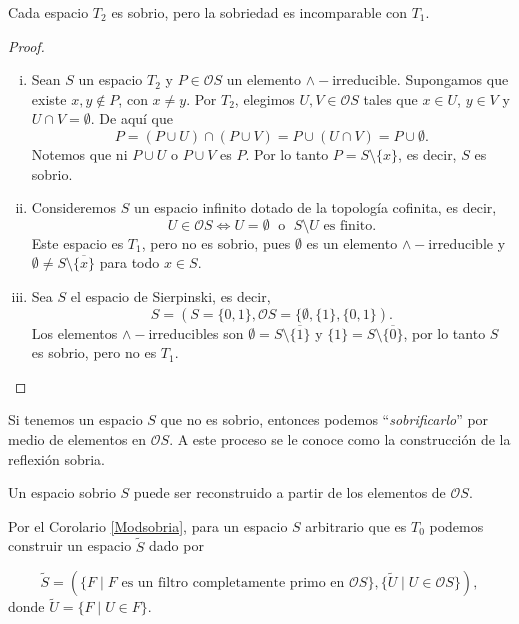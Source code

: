 \documentclass{comunicaciones}
\begin{document}
\begin{prop}
    Cada espacio $T_2$ es sobrio, pero la sobriedad es incomparable con $T_1$.
\end{prop}

\begin{proof}
    \begin{enumerate}[i)]
        \item Sean $S$ un espacio $T_2$ y $P\in \mathcal{O}S$ un elemento $\wedge-$irreducible. Supongamos que existe $x, y\notin P$, con $x\neq y$. Por $T_2$, elegimos $U, V\in\mathcal{O}S$ tales que $x\in U$, $y\in V$ y $U\cap V=\emptyset$. De aquí que
        \[
        P=(P\cup U)\cap (P\cup V)=P\cup (U\cap V)=P\cup \emptyset.
        \]
        Notemos que ni $P\cup U$ o $P\cup V$ es $P$. Por lo tanto $P=S\setminus \{x\}$, es decir, $S$ es sobrio.
        \item Consideremos $S$ un espacio infinito dotado de la topología cofinita, es decir, 
        \[
        U\in\mathcal{O}S\Leftrightarrow U=\emptyset\; \mbox{ o }\;S\setminus U \mbox{ es finito}.
        \]
        Este espacio es $T_1$, pero no es sobrio, pues $\emptyset$ es un elemento $\wedge-$irreducible y $\emptyset\neq S\setminus \overline{\{x\}}$ para todo $x\in S$.
        \item Sea $S$ el espacio de Sierpinski, es decir,
        \[
        S=(S=\{0,1\},\mathcal{O}S=\{\emptyset,\{1\},\{0,1\}).
        \]
        Los elementos $\wedge-$irreducibles son $\emptyset=S\setminus\overline{\{1\}}$ y $\{1\}=S\setminus \overline{\{0\}}$, por lo tanto $S$ es sobrio, pero no es $T_1$.
    \end{enumerate}
\end{proof}

Si tenemos un espacio $S$ que no es sobrio, entonces podemos ``\emph{sobrificarlo}'' por medio de elementos en $\mathcal{O}S$. A este proceso se le conoce como la construcción de la reflexión sobria. 
\begin{cor}\label{Modsobria}
    Un espacio sobrio $S$ puede ser reconstruido a partir de los elementos de $\mathcal{O}S$.  
\end{cor}

Por el Corolario \ref{Modsobria}, para un espacio $S$ arbitrario que es $T_0$ podemos construir un espacio $\tilde{S}$ dado por 

\[
\tilde{S}=(\{F\mid F \mbox{ es un filtro completamente primo en }\mathcal{O}S\}, \{\tilde{U}\mid U\in \mathcal{O}S\}),
\]
donde $\tilde{U}=\{F\mid U\in F\}$.\\
\end{document}
